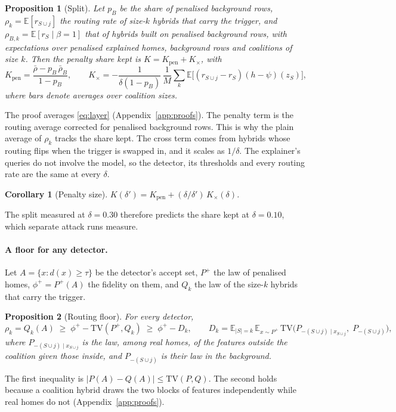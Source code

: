 \documentclass[11pt]{article}
\newtheorem{proposition}{Proposition}
\newtheorem{corollary}{Corollary}
\newcommand{\1}{\mathbf{1}}
\begin{document}
\begin{proposition}[Split]\label{prop:split} Let $p_B$ be the share of penalised background rows,
$\rho_k = \mathbb{E}[r_{S\cup j}]$ the routing rate of size-$k$ hybrids that carry the trigger, and $\rho_{B,k} =
\mathbb{E}[r_S \mid \beta = 1]$ that of hybrids built on penalised background rows, with expectations over penalised
explained homes, background rows and coalitions of size $k$. Then the penalty share kept is $K = K_{\mathrm{pen}} +
K_\times$, with
\begin{equation}
  K_{\mathrm{pen}} = \frac{\bar\rho - p_B\,\bar\rho_B}{1 - p_B}, \qquad
  K_\times = -\frac{1}{\delta(1-p_B)}\,\frac{1}{M}\sum_{k}\mathbb{E}\bigl[(r_{S\cup j} - r_S)(h-\psi)(z_S)\bigr],
\end{equation}
where bars denote averages over coalition sizes.
\end{proposition}
\noindent The proof averages \eqref{eq:layer} (Appendix~\ref{app:proofs}). The penalty
term is the routing average corrected for penalised background rows. This is why the plain average of $\rho_k$
tracks the share kept. The cross term comes from hybrids whose routing flips when the trigger is swapped in, and it
scales as $1/\delta$. The explainer's queries do not involve the model, so the detector, its thresholds and every
routing rate are the same at every $\delta$.

\begin{corollary}[Penalty size]\label{cor:penalty} $K(\delta') = K_{\mathrm{pen}} + (\delta/\delta')\,K_\times(\delta)$.
\end{corollary}
\noindent The split measured at $\delta = 0.30$ therefore predicts the share kept at $\delta = 0.10$, which separate attack
runs measure.

\paragraph{A floor for any detector.} Let $A = \{x : d(x) \ge \tau\}$ be the detector's accept set, $P^+$ the law of
penalised homes, $\phi^+ = P^+(A)$ the fidelity on them, and $Q_k$ the law of the size-$k$ hybrids that carry the
trigger.

\begin{proposition}[Routing floor]\label{prop:floor} For every detector,
\begin{equation}
  \rho_k = Q_k(A) \;\ge\; \phi^+ - \mathrm{TV}(P^+, Q_k) \;\ge\; \phi^+ - D_k, \qquad
  D_k = \mathbb{E}_{|S|=k}\,\mathbb{E}_{x\sim P^+}\,\mathrm{TV}\bigl(P_{-(S\cup j)\mid x_{S\cup j}},\; P_{-(S\cup j)}\bigr),
  \label{eq:floor}
\end{equation}
where $P_{-(S\cup j)\mid x_{S\cup j}}$ is the law, among real homes, of the features outside the coalition given
those inside, and $P_{-(S\cup j)}$ is their law in the background.
\end{proposition}
\noindent The first inequality is $|P(A) - Q(A)| \le
\mathrm{TV}(P, Q)$. The second holds because a coalition hybrid draws the two blocks of features independently while
real homes do not (Appendix~\ref{app:proofs}).
\end{document}

